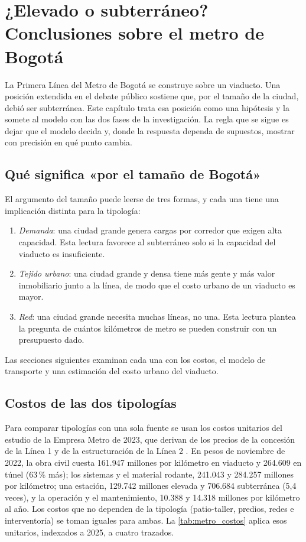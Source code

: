 \chapter{¿Elevado o subterráneo? Conclusiones sobre el metro de Bogotá}\label{cap:metro}

La Primera Línea del Metro de Bogotá se construye sobre un viaducto. Una posición extendida en el debate
público sostiene que, por el tamaño de la ciudad, debió ser subterránea. Este capítulo trata esa
posición como una hipótesis y la somete al modelo con las dos fases de la investigación. La regla que
se sigue es dejar que el modelo decida y, donde la respuesta dependa de supuestos, mostrar con
precisión en qué punto cambia.

\section{Qué significa «por el tamaño de Bogotá»}

El argumento del tamaño puede leerse de tres formas, y cada una tiene una implicación distinta para la
tipología:
\begin{enumerate}[nosep]
\item \emph{Demanda}: una ciudad grande genera cargas por corredor que exigen alta capacidad. Esta
      lectura favorece al subterráneo solo si la capacidad del viaducto es insuficiente.
\item \emph{Tejido urbano}: una ciudad grande y densa tiene más gente y más valor inmobiliario junto a
      la línea, de modo que el costo urbano de un viaducto es mayor.
\item \emph{Red}: una ciudad grande necesita muchas líneas, no una. Esta lectura plantea la pregunta de
      cuántos kilómetros de metro se pueden construir con un presupuesto dado.
\end{enumerate}
Las secciones siguientes examinan cada una con los costos, el modelo de transporte y una estimación
del costo urbano del viaducto.

\section{Costos de las dos tipologías}\label{sec:costos_metro}

Para comparar tipologías con una sola fuente se usan los costos unitarios del estudio de la Empresa
Metro de 2023, que derivan de los precios de la concesión de la Línea 1 y de la estructuración de la
Línea 2 \citep{emb2023}. En pesos de noviembre de 2022, la obra civil cuesta 161.947 millones por
kilómetro en viaducto y 264.609 en túnel (63\,\% más); los sistemas y el material rodante, 241.043 y
284.257 millones por kilómetro; una estación, 129.742 millones elevada y 706.684 subterránea (5,4
veces), y la operación y el mantenimiento, 10.388 y 14.318 millones por kilómetro al año. Los costos
que no dependen de la tipología (patio-taller, predios, redes e interventoría) se toman iguales para
ambas. La \cref{tab:metro_costos} aplica esos unitarios, indexados a 2025, a cuatro trazados.

